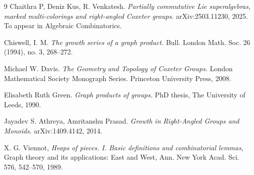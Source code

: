 \documentclass[11pt,reqno]{amsart}
\numberwithin{equation}{section} %
\theoremstyle{definition}
\theoremstyle{remark}
\numberwithin{equation}{section}
\begin{document}
\begin{thebibliography}{9}
Chaithra P, Deniz Kus, R. Venkatesh. \emph{Partially commutative Lie superalgebras, marked multi-colorings and right-angled Coxeter groups.}  arXiv:2503.11230, 2025. To appear in Algebraic Combinatorics.

Chiswell, I. M. \emph{
The growth series of a graph product.}
Bull. London Math. Soc. 26 (1994), no. 3, 268–272.

Michael W. Davis. \emph{The Geometry and Topology of Coxeter Groups.}
London Mathematical Society Monograph Series. Princeton University
Press, 2008.

Elisabeth Ruth Green. \emph{Graph products of groups.} PhD thesis, The University of Leeds, 1990.

Jayadev S. Athreya, Amritanshu Prasad. \emph{
Growth in Right-Angled Groups and Monoids}. 	arXiv:1409.4142, 2014.


X. G. Viennot,
\emph{Heaps of pieces. I. Basic definitions and combinatorial lemmas},
Graph theory and its applications: East and West, Ann. New York Acad. Sci. 576, 542--570, 1989.


\end{thebibliography}
\end{document}
